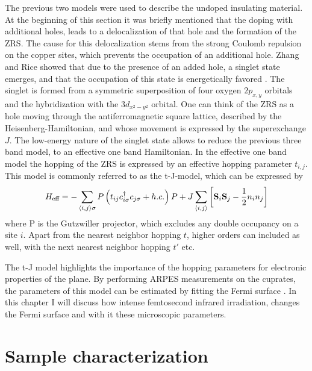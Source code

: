 The previous two models were used to describe the undoped insulating material.
At the beginning of this section it was briefly mentioned that the doping with additional holes, leads to a delocalization of that hole and the formation of the ZRS.
The cause for this delocalization stems from the strong Coulomb repulsion on the copper sites, which prevents the occupation of an additional hole.
Zhang and Rice showed that due to the presence of an added hole, a singlet state emerges, and that the occupation of this state is energetically favored \cite{zhang_effective_1988}.
The singlet is formed from a symmetric superposition of four oxygen $2p_{x,y}$ orbitals and the hybridization with the  $3d_{x^2-y^2}$ orbital.
One can think of the ZRS as a hole moving through the antiferromagnetic square lattice, described by the Heisenberg-Hamiltonian, and whose movement is expressed by the superexchange $J$.
The low-energy nature of the singlet state allows to reduce the previous three band model, to an effective one band Hamiltonian.
In the effective one band model the hopping of the ZRS is expressed by an effective hopping parameter $t_{i,j}$.
This model is commonly referred to as the t-J-model, which can be expressed by
\begin{equation}
	H_\text{eff} = - \sum_{\braket{i,j}\sigma} P \left( t_{ij} c_{i\sigma}^\dagger c_{j\sigma} + h.c. \right) P + J \sum_{\braket{i,j}} \left[\mathbf{S}_i \mathbf{S}_j - \frac{1}{2} n_i n_j\right]
\end{equation}
where P is the Gutzwiller projector, which excludes any double occupancy on a site $i$.
Apart from the nearest neighbor hopping $t$, higher orders can included as well, with the next nearest neighbor hopping $t'$ etc.

The t-J model highlights the importance of the hopping parameters for electronic properties of the  plane.
By performing ARPES measurements on the cuprates, the parameters of this model can be estimated by fitting the Fermi surface \cite{norman_phenomenological_1995}.
In this chapter I will discuss how intense femtosecond infrared irradiation, changes the Fermi surface and with it these microscopic parameters.

\section{Sample characterization}

